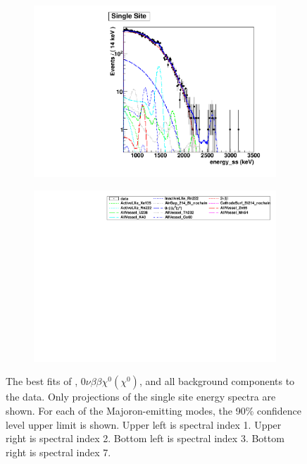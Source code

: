 \documentclass[herrin-thesis.tex]{subfiles}
\begin{document}
\begin{figure}[htp]
\begin{subfigure}[c]{0.48\textwidth}
	\end{subfigure}\hfill%
	\begin{subfigure}[c]{0.48\textwidth}
	\centering
	\includegraphics[width=\textwidth]{./plots/analysis_bb0nX7_90_fit_e_ss.pdf}
	\end{subfigure}
	\begin{subfigure}[c]{\textwidth}
	\centering
	\includegraphics[width=\textwidth]{./plots/analysis_bb0nX_90_fit_legend.pdf}
	\end{subfigure}
\caption[Fits for \(0\nu\beta\beta\chi^0(\chi^0)\)]{The best fits of \twonu{}, \(0\nu\beta\beta\chi^0(\chi^0)\), and all background components to the data. Only projections of the single site energy spectra are shown. For each of the Majoron-emitting modes, the 90\% confidence level upper limit is shown. Upper left is spectral index 1. Upper right is spectral index 2. Bottom left is spectral index 3. Bottom right is spectral index 7.}
\label{fig:analysis_bb0nX_best_fit}
\end{figure}
\end{document}
